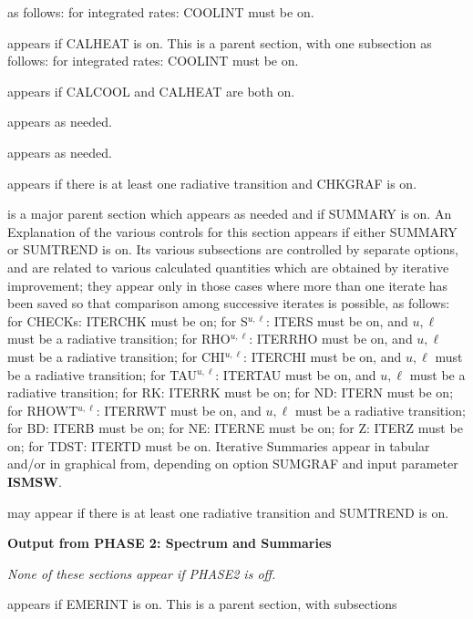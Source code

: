 as follows:
\bull for integrated rates: COOLINT must be on.
\blankline
{} \par
appears if CALHEAT is on. This is a parent section, with one subsection
as follows:
\bull for integrated rates: COOLINT must be on.
\blankline
{} \par
appears if CALCOOL and CALHEAT are both on.
\ej
{} \par
appears as needed.
\blankline
{} \par
appears as needed.
\blankline
{} \par
appears if there is at least one radiative transition and CHKGRAF is on.
\blankline
{} \par
is a major parent section which appears as needed and if SUMMARY is on.
An Explanation of the various controls for this section appears if
either SUMMARY or SUMTREND is on.
Its various subsections are controlled by separate options, and are
related to various calculated quantities which
are obtained by iterative improvement; they appear only in those cases
where more than one iterate has been saved so that comparison among
successive iterates is possible, as follows:
\bull for CHECKs: ITERCHK must be on;
\bull for S$^{u,\ell}$: ITERS must be on, and $u,\ell$ must be a 
radiative transition;
\bull for RHO$^{u,\ell}$: ITERRHO must be on, and $u,\ell$ must be a 
radiative transition;
\bull for CHI$^{u,\ell}$: ITERCHI must be on, and $u,\ell$ must be a 
radiative transition;
\bull for TAU$^{u,\ell}$: ITERTAU must be on, and $u,\ell$ must be a 
radiative transition;
\bull for RK: ITERRK must be on;
\bull for ND: ITERN must be on;
\bull for RHOWT$^{u,\ell}$: ITERRWT must be on, and $u,\ell$ must be a 
radiative transition;
\bull for BD: ITERB must be on;
\bull for NE: ITERNE must be on;
\bull for Z: ITERZ must be on;
\bull for TDST: ITERTD must be on. \np
Iterative Summaries appear in tabular and/or in graphical from,
depending on option SUMGRAF and input parameter {\bf ISMSW}.
\blankline
{} \par
may appear if there is at least one radiative transition and SUMTREND is on.
\ej
\centerline{\bf Output from {\rm PHASE 2}: Spectrum and Summaries}
\blankline
\blankline
\blankline
\centerline{\it None of these sections appear if {\rm PHASE2} 
is off.}
\blankline
\blankline
\blankline
{} \par
appears if EMERINT is on. This is a parent section, with subsections
